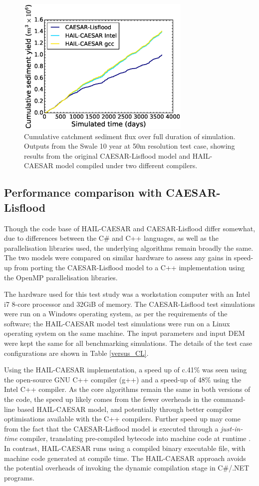 \begin{figure}[t]
\includegraphics[width=8.3cm]{chp05_figures_scripts/cum_sed_tot_regression.eps}
\caption{Cumulative catchment sediment flux over full duration of simulation. Outputs from the Swale 10 year at 50m resolution test case, showing results from the original CAESAR-Lisflood model and HAIL-CAESAR model compiled under two different compilers.}
\label{fig_swale_regression_cum_sediment}
\end{figure}

\subsection{Performance comparison with CAESAR-Lisflood}

Though the code base of HAIL-CAESAR and CAESAR-Lisflood differ somewhat, due to differences between the C\# and C++ languages, as well as the parallelisation libraries used, the underlying algorithms remain broadly the same. The two models were compared on similar hardware to assess any gains in speed-up from porting the CAESAR-Lisflood model to a C++ implementation using the OpenMP parallelisation libraries.

The hardware used for this test study was a workstation computer with an Intel i7 8-core processor and 32GiB of memory. The CAESAR-Lisflood test simulations were run on a Windows operating system, as per the requirements of the software; the HAIL-CAESAR model test simulations were run on a Linux operating system on the same machine. The input parameters and input DEM were kept the same for all benchmarking simulations. The details of the test case configurations are shown in Table \ref{versus_CL}.

Using the HAIL-CAESAR implementation, a speed up of c.41\% was seen using the open-source GNU C++ compiler (g++) and a speed-up of 48\% using the Intel C++ compiler. As the core algorithms remain the same in both versions of the code, the speed up likely comes from the fewer overheads in the command-line based HAIL-CAESAR model, and potentially through better compiler optimisations available with the C++ compilers. Further speed up may come from the fact that the CAESAR-Lisflood model is executed through a \textit{just-in-time} compiler, translating pre-compiled bytecode into machine code at runtime \citep{aycock2003brief}. In contrast, HAIL-CAESAR runs using a compiled binary executable file, with machine code generated at compile time. The HAIL-CAESAR approach avoids the potential overheads of invoking the dynamic compilation stage in C\#/.NET programs.

